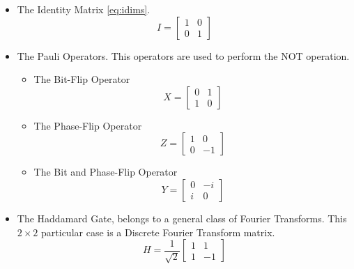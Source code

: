 \begin{itemize}
\item The Identity Matrix \ref{eq:idims}.
\begin{equation}
\label{eq:idims}
I=\left[\begin{array}{cc}
1 & 0\\
0 & 1
\end{array}\right]
\end{equation}

\item The Pauli Operators. This operators are used to perform the NOT operation. 
	\begin{itemize}
		\item The Bit-Flip Operator\begin{equation}
\label{eq:idims_1}
X=\left[\begin{array}{cc}
0 & 1\\
1 & 0
\end{array}\right]
\end{equation}
		\item The Phase-Flip Operator\begin{equation}
\label{eq:idims_2}
Z=\left[\begin{array}{cc}
1 & 0\\
0 & -1
\end{array}\right]
\end{equation}
\item The Bit and Phase-Flip Operator\begin{equation}
\label{eq:idims_3}
Y=\left[\begin{array}{cc}
0 & -i\\
i & 0
\end{array}\right]
\end{equation}
	\end{itemize}
\item The Haddamard Gate, belongs to a general class of Fourier Transforms. This $2\times 2$ particular case is a Discrete Fourier Transform matrix.
\begin{equation}
\label{eq:idimssd_3}
H=\frac{1}{\sqrt{2}}\left[\begin{array}{cc}
1 & 1\\
1 & -1
\end{array}\right]
\end{equation}
\end{itemize}


